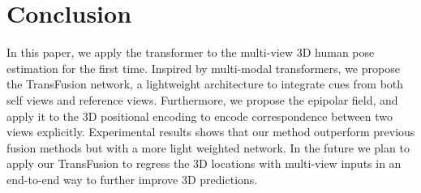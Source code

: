 \documentclass{bmvc2k}
\begin{document}
\section{Conclusion}
\vspace{-0.5em}
In this paper, we apply the transformer to the multi-view 3D human pose estimation for the first time. Inspired by multi-modal transformers, we propose the TransFusion network, a lightweight architecture to integrate cues from both self views and reference views. Furthermore, we propose the epipolar field, and apply it to the 3D  positional encoding to encode correspondence between two views explicitly. Experimental results shows that our method outperform previous fusion methods but with a more light weighted network. 
In the future we plan to apply our TransFusion to regress the 3D locations with multi-view inputs in an end-to-end way to further improve 3D predictions. 
\end{document}
